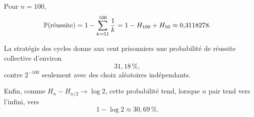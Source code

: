 \documentclass[11pt,a4paper]{article}
\begin{document}
Pour $n=100$,
\[
\mathbb P(\text{réussite})
=1-\sum_{k=51}^{100}\frac1k
=1-H_{100}+H_{50}
\approx 0{,}3118278.
\]

\begin{resultbox}
La stratégie des cycles donne aux cent prisonniers une probabilité de réussite
collective d'environ
\[
\boxed{31{,}18\,\%},
\]
contre $2^{-100}$ seulement avec des choix aléatoires indépendants.
\end{resultbox}

Enfin, comme $H_n-H_{n/2}\to\log 2$, cette probabilité tend, lorsque $n$ pair
tend vers l'infini, vers
\[
1-\log 2\approx 30{,}69\,\%.
\]
\end{document}
